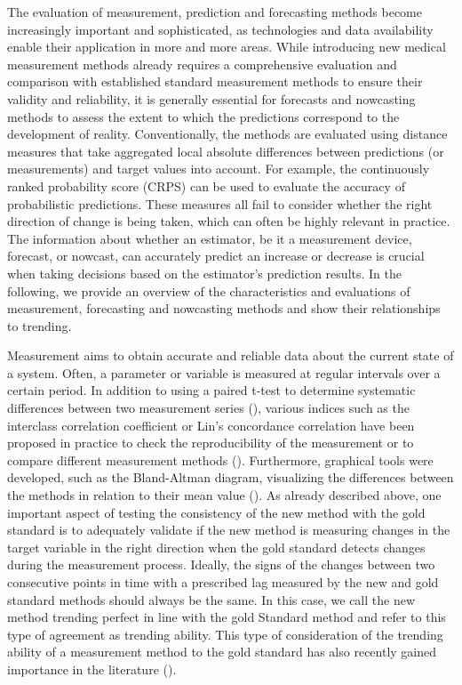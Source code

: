The evaluation of measurement, prediction and forecasting methods become increasingly important and sophisticated, as technologies and data availability enable their application in more and more areas. While introducing new medical measurement methods already requires a comprehensive evaluation and comparison with established standard measurement methods to ensure their validity and reliability, it is generally essential for forecasts and nowcasting methods to assess the extent to which the predictions correspond to the development of reality. Conventionally, the methods are evaluated using distance measures that take aggregated local absolute differences between predictions (or measurements) and target values into account. For example, the continuously ranked probability score (CRPS) can be used to evaluate the accuracy of probabilistic predictions. %
These measures all fail to consider whether the right direction of change is being taken, which can often be highly relevant in practice. The information about whether an estimator, be it a measurement device, forecast, or nowcast, can accurately predict an increase or decrease is crucial when taking decisions based  on  the estimator's prediction results. In the following, we provide an overview of the characteristics and evaluations of measurement, forecasting and nowcasting methods and show their relationships to trending. 

Measurement aims to obtain accurate and reliable data about the current state of a system. Often, a parameter or variable is measured at regular intervals over a certain period. In addition to using a paired t-test to determine systematic differences between two measurement series (\cite{watson2010method}), various indices such as the interclass correlation coefficient or Lin's concordance correlation have been proposed in practice to check the reproducibility of the measurement or to compare different measurement methods (\cite{lawrence1989concordance,koo2016guideline}). Furthermore, graphical tools were developed, such as the Bland-Altman diagram, visualizing the differences between the methods in relation to their mean value (\cite{bland1986statistical}). As already described above, one important aspect of testing the consistency of the new method with the gold standard is to adequately validate if the new method is measuring changes in the target variable in the right direction when the gold standard detects changes during the measurement process. 
Ideally, the signs of the changes between two consecutive points in time with a prescribed lag measured by the new and gold standard methods should always be the same. 
In this case, we call the new method trending perfect in line with the gold Standard method and refer to this type of agreement as trending ability. 
This type of consideration of the trending ability of a measurement method to the gold standard has also recently gained importance in the literature (\cite{saugel2015tracking, saugel2018error, hiraishi2021concordance}). 


